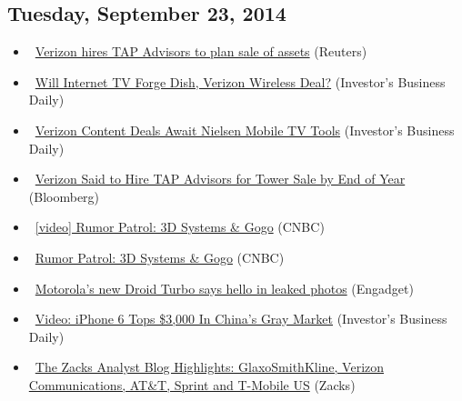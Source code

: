 \documentclass[11pt,asymmetric]{article}
\begin{document}
\subsection*{Tuesday, September 23, 2014}
\begin{itemize}
\item\ \href{http://finance.yahoo.com/news/verizon-hires-tap-advisors-plan-235123169.html}{Verizon hires TAP Advisors to plan sale of assets} (Reuters)
\item\ \href{http://news.investors.com/092314-718624-dish-network-verizon-ready-Internet-video-services.htm?ven=yahoocp&src=aurlled&ven=yahoo}{Will Internet TV Forge Dish, Verizon Wireless Deal?} (Investor's Business Daily)
\item\ \href{http://news.investors.com/092314-718622-verizon-lte-multicast-technology-mobile-video.htm?ven=yahoocp&src=aurlled&ven=yahoo}{Verizon Content Deals Await Nielsen Mobile TV Tools} (Investor's Business Daily)
\item\ \href{http://www.bloomberg.com/news/2014-09-23/verizon-said-to-hire-tap-advisors-for-tower-sale-by-end-of-year.html?cmpid=yhoo}{Verizon Said to Hire TAP Advisors for Tower Sale by End of Year} (Bloomberg)
\item\ \href{http://video.cnbc.com/gallery/?video=3000313182&__source=yahoo%7cheadline%7cquote%7cvideo%7c&par=yahoo}{[video] Rumor Patrol: 3D Systems \& Gogo} (CNBC)
\item\ \href{http://finance.yahoo.com/video/rumor-patrol-3d-systems-gogo-212500790.html}{Rumor Patrol: 3D Systems \& Gogo} (CNBC)
\item\ \href{http://www.engadget.com/2014/09/23/motorola-droid-turbo/?ncid=rss_truncated}{Motorola's new Droid Turbo says hello in leaked photos} (Engadget)
\item\ \href{http://news.investors.com/092314-718549-apple-iphone-6-china-availability-impacts-forecasts.htm?ven=yahoocp&src=aurlled&ven=yahoo}{Video: iPhone 6 Tops \$3,000 In China's Gray Market} (Investor's Business Daily)
\item\ \href{http://finance.yahoo.com/news/zacks-analyst-blog-highlights-glaxosmithkline-114146704.html}{The Zacks Analyst Blog Highlights: GlaxoSmithKline, Verizon Communications, AT\&T, Sprint and T-Mobile US} (Zacks)
\end{itemize}
\end{document}
